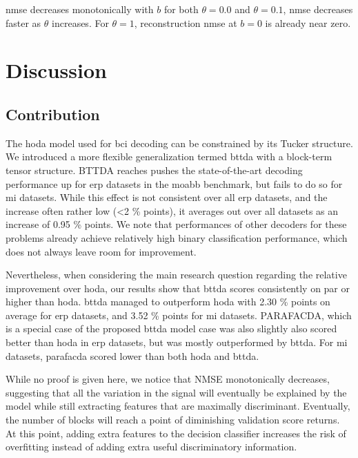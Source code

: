 \documentclass[twocolumn]{article}
\begin{document}
	\Ac{nmse} decreases monotonically with $b$ for both $\theta=0.0$ and $\theta=0.1$,
	\Ac{nmse} decreases faster as $\theta$ increases.
	For $\theta=1$, reconstruction \ac{nmse} at $b=0$ is already near zero.

	\section{Discussion}
	\subsection{Contribution}

	The \ac{hoda} model used for \ac{bci} decoding can be constrained by its
	Tucker structure.
	We introduced a more flexible generalization termed \ac{bttda} with a
	block-term tensor structure.
	BTTDA reaches pushes the state-of-the-art decoding performance up for \ac{erp}
	datasets in the \ac{moabb} benchmark, but fails to do so for \ac{mi} datasets.
	While this effect is not consistent over all \ac{erp} datasets, and the
	increase often rather low (<2 \% points), it averages out over all datasets
	as an increase of 0.95 \% points.
	We note that performances of other decoders for these problems already achieve
	relatively high binary classification performance, which does not always leave
	room for improvement.



	Nevertheless, when considering the main research question regarding the
	relative improvement over \ac{hoda}, our results show that
	\ac{bttda} scores consistently on par or higher than \ac{hoda}.
	\Ac{bttda} managed to outperform \ac{hoda} with 2.30 \% points on average for
	\ac{erp} datasets, and 3.52 \% points for \ac{mi} datasets.
	PARAFACDA, which is a special case of the proposed \ac{bttda} model
	case was also slightly also scored better than  \ac{hoda} in \ac{erp} datasets,
	but was mostly outperformed by \ac{bttda}.
	For \ac{mi} datasets, \ac{parafacda} scored lower than both \ac{hoda} and \ac{bttda}.

	While no proof is given here, we notice that NMSE monotonically decreases, suggesting
	that all the variation in the signal will eventually be explained by the model
	while still extracting features that are maximally discriminant.
	Eventually, the number of blocks will reach a point of diminishing validation
	score returns.
	At this point, adding extra features to the decision classifier increases
	the risk of overfitting instead of adding extra useful discriminatory
	information.
\end{document}
